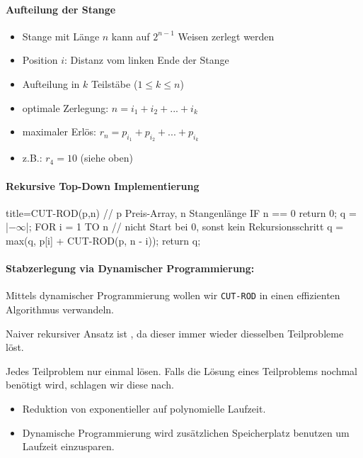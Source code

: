 \documentclass[
    ngerman,
    color=3b,
    dark_mode,
    load_common, %
    summary,
    boxarc,
]{tuda_summary}
\begin{document}
\paragraph{Aufteilung der Stange}
\begin{itemize}
    \item Stange mit Länge $n$ kann auf $2^{n-1}$ Weisen zerlegt werden
    \item Position $i$: Distanz vom linken Ende der Stange
    \item Aufteilung in $k$ Teilstäbe ($1 \leq k \leq n$)
    \item optimale Zerlegung: $n = i_1 + i_2 + ... + i_k$
    \item maximaler Erlös: $r_n = p_{i_1} + p_{i_2} + ... + p_{i_k}$
    \item z.B.: $r_4 = 10$ (siehe oben)
\end{itemize}
\clearpage
\paragraph{Rekursive Top-Down Implementierung}\mbox{}

\begin{codeBlock}[autogobble,escapeinside=||]{title={CUT-ROD(p,n)    // p Preis-Array, n Stangenlänge}}
    IF n == 0
        return 0;
    q = |$-\infty$|;
    FOR i = 1 TO n  // nicht Start bei 0, sonst kein Rekursionsschritt
        q = max(q, p[i] + CUT-ROD(p, n - i));
    return q;
\end{codeBlock}
\paragraph{Stabzerlegung via Dynamischer Programmierung:}
\begin{description}[leftmargin=2cm]
    \item [Ziel]
          Mittels dynamischer Programmierung wollen wir \texttt{CUT-ROD} in einen effizienten
          Algorithmus verwandeln.
    \item [Bemerkung]
          Naiver rekursiver Ansatz ist , da dieser immer wieder diesselben
          Teilprobleme löst.
    \item [Ansatz]
          Jedes Teilproblem nur einmal lösen. Falls die Lösung eines Teilproblems nochmal benötigt
          wird, schlagen wir diese nach.
\end{description}
\begin{itemize}
    \item Reduktion von exponentieller auf polynomielle Laufzeit.
    \item Dynamische Programmierung wird zusätzlichen Speicherplatz benutzen um Laufzeit einzusparen.
\end{itemize}
\end{document}
